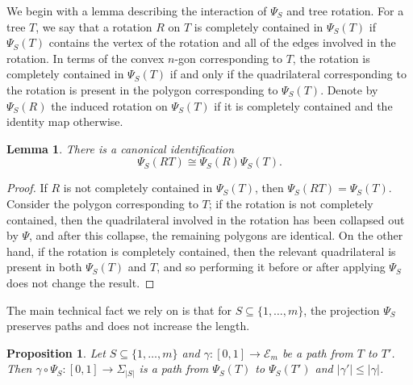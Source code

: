 \documentclass[a4paper,11pt]{article}
\newtheorem{lemma}{Lemma}
\newtheorem{proposition}[theorem]{Proposition}
\newcommand{\aE}{\mathcal{E}}
\begin{document}
We begin with a lemma describing the interaction of $\Psi_S$ and tree rotation.
For a tree $T$, we say that a rotation $R$ on $T$ is completely contained in $\Psi_S(T)$ if $\Psi_S(T)$ contains the vertex of the rotation and all of the edges involved in the rotation.
In terms of the convex $n$-gon corresponding to $T$, the rotation is completely contained in $\Psi_S(T)$ if and only if the quadrilateral corresponding to the rotation is present in the polygon corresponding to $\Psi_S(T)$.
Denote by $\Psi_S(R)$ the induced rotation on $\Psi_S(T)$ if it is completely contained and the identity map otherwise.

\begin{lemma}\label{lem:rotprojcom}
There is a canonical identification
\[
\Psi_S(RT) \cong \Psi_S(R) \Psi_S(T).
\]
\end{lemma}

\begin{proof}
If $R$ is not completely contained in $\Psi_S(T)$, then $\Psi_S(RT) = \Psi_S(T)$.
Consider the polygon corresponding to $T$; if the rotation is not completely contained, then the quadrilateral involved in the rotation has been collapsed out by $\Psi$, and after this collapse, the remaining polygons are identical.
On the other hand, if the rotation is completely contained, then the relevant quadrilateral is present in both $\Psi_S(T)$ and $T$, and so performing it before or after applying $\Psi_S$ does not change the result.
\end{proof}

The main technical fact we rely on is that for $S \subseteq \{1,\ldots,m\}$, the projection $\Psi_S$ preserves paths and does not increase the length.  

\begin{proposition}\label{prop:projcont}
Let $S \subseteq \{1,\ldots,m\}$ and $\gamma \colon [0,1] \to \aE_m$ be a path from $T$ to $T'$.
Then $\gamma \circ \Psi_S \colon [0,1] \to \Sigma_{|S|}$ is a path from $\Psi_S(T)$ to $\Psi_S(T')$ and $|\gamma'| \leq |\gamma|$.
\end{proposition}
\end{document}

